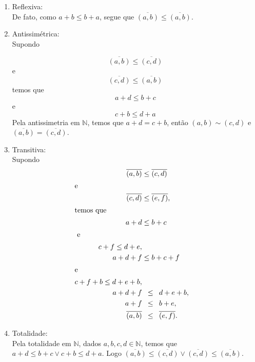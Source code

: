 \documentclass[../main.tex]{subfiles}
\begin{document}
\begin{dem}
    \begin{enumerate}[label=(\roman*)]
        \item Reflexiva: \\
            De fato, como $a+b \leq b+a$, segue que $\overline{(a,b)} \leq \overline{(a,b)}$.
        
        \item Antissimétrica: \\
            Supondo
            
            \[ \overline{(a,b)} \leq \overline{(c,d)} \]  
            e 
            \[ \overline{(c,d)} \leq \overline{(a,b)} \]
            temos que 
            \[ a+d \leq b+c\] 
            e
            \[ c+b \leq d+a \]
            Pela antissimetria em $\mathbb{N}$, temos que $a+d = c+b$, então $(a,b) \sim (c,d)$ e $\overline{(a,b)} = \overline{(c,d)} $.
        
        \item Transitiva: \\
            Supondo
            \begin{align*}
                \overline{(a,b)} &\leq \overline{(c,d)} \\ \shortintertext{e} 
                \overline{(c,d)} &\leq \overline{(e,f)},  \\ \shortintertext{temos que}
                a+d &\leq b+c & \\ \shortintertext{ e } 
                c+f \leq d+e,  \\ 
                a+d+f &\leq b + c + f  \\ \shortintertext{e} 
                c + f + b \leq d + e + b,  \\ 
                a + d + f & \hspace{8pt} {\leq} \hspace{8pt} d + e + b, \\ 
                a + f & \hspace{8pt} {\leq} \hspace{8pt} b + e, \\
                \overline{(a,b)}  & \hspace{8pt} {\leq} \hspace{8pt} \overline{(e,f)}.
            \end{align*}
            
        \item Totalidade: \\
        Pela totalidade em $\mathbb{N}$, dados $a,b,c,d \in \mathbb{N}$, temos que $a+d \leq b+c \lor c+b \leq d+a$. Logo 
        $\overline{(a,b)} \leq \overline{(c,d)} \lor  \overline{(c,d)} \leq  \overline{(a,b)}$.
        

\end{enumerate}
\end{dem}
\end{document}
